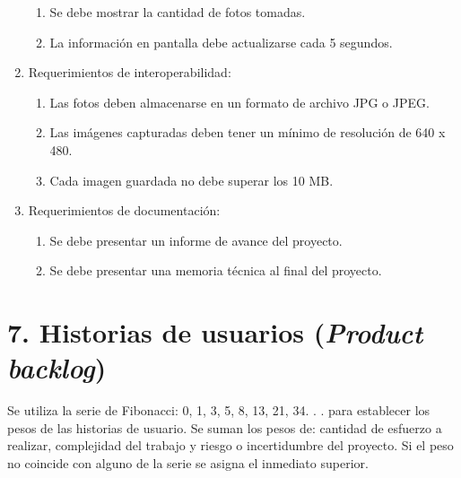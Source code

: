 \documentclass[
11pt, %
]{charter}
\begin{document}
\begin{enumerate}
\begin{enumerate}
            \item Se debe mostrar la cantidad de fotos tomadas.
            \item La información en pantalla debe actualizarse cada 5 segundos.
		\end{enumerate}
    \item Requerimientos de interoperabilidad:
		\begin{enumerate}
			\item Las fotos deben almacenarse en un formato de archivo JPG o JPEG.
			\item Las imágenes capturadas deben tener un mínimo de resolución de 640 x 480.
            \item Cada imagen guardada no debe superar los 10 MB.
		\end{enumerate}
    \item Requerimientos de documentación:
		\begin{enumerate}
			\item Se debe presentar un informe de avance del proyecto.
			\item Se debe presentar una memoria técnica al final del proyecto.
		\end{enumerate}
\end{enumerate}


\section{7. Historias de usuarios (\textit{Product backlog})}
\label{sec:backlog}

Se utiliza la serie de Fibonacci: 0, 1, 3, 5, 8, 13, 21, 34. . . para establecer los pesos de las historias de usuario. Se suman los pesos de: cantidad de esfuerzo a realizar, complejidad del trabajo y riesgo o incertidumbre del proyecto. Si el peso no coincide con alguno de la serie se asigna el inmediato superior.
\end{document}
